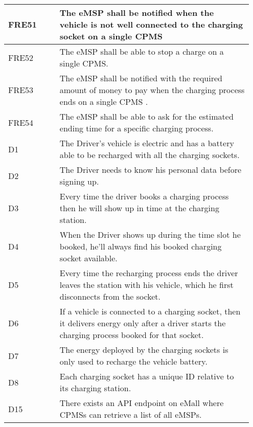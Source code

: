 {\begin{longtable}{|p{0.20\linewidth}p{0.75\linewidth} |}
    \hline
    \rowcolor{bluepoli!15} FRE51 & The eMSP shall be notified when the vehicle is not well connected to the charging socket on a single CPMS \\
    \hline
    \rowcolor{bluepoli!15} FRE52 & The eMSP shall be able to stop a charge on a single CPMS. \\
    \hline
    \rowcolor{bluepoli!15} FRE53 &  The eMSP shall be notified with the required amount of money to pay when the charging process ends on a single CPMS .\\
    \hline
    \rowcolor{bluepoli!15} FRE54 & The eMSP shall be able to ask for the estimated ending time for a specific charging process. \\
    \hline
    \rowcolor{bluepoli!5} D1 & The Driver's vehicle is electric and has a battery able to be recharged with all the charging sockets.\\
    \hline
    \rowcolor{bluepoli!5} D2 & The Driver needs to know his personal data before signing up.\\
    \hline
    \rowcolor{bluepoli!5} D3 & Every time the driver books a charging process then he will show up in time at the charging station.\\
    \hline
    \rowcolor{bluepoli!5} D4 & When the Driver shows up during the time slot he booked, he’ll always find his booked charging socket available.\\
    \hline
    \rowcolor{bluepoli!5} D5 & Every time the recharging process ends the driver leaves the station with his vehicle, which he first disconnects from the socket.\\
    \hline    
    \rowcolor{bluepoli!5} D6& If a vehicle is connected to a charging socket, then it delivers energy only after a driver starts the charging process booked for that socket.\\
    \hline
    \rowcolor{bluepoli!5} D7 & The energy deployed by the charging sockets is only used to recharge the vehicle battery.\\
    \hline 
    \rowcolor{bluepoli!5} D8 &
    Each charging socket has a unique ID relative to its charging station.\\
    \hline
    \rowcolor{bluepoli!5} D15 & There exists an API endpoint on eMall where CPMSs can retrieve a list of all eMSPs.\\
    \hline
\end{longtable}}
